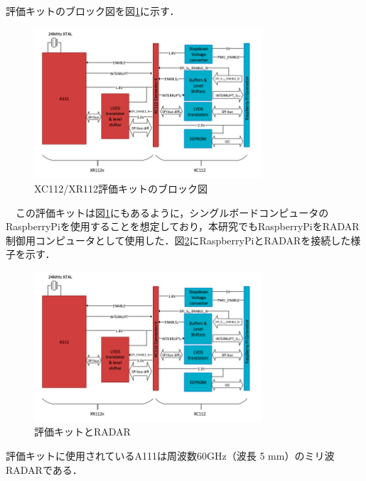 評価キットのブロック図を図\ref{fig:EVK_Block}に示す．
\begin{figure}[H]
    \centering
    \includegraphics[width=8.5cm]{./fig/EVK_Block.png}
    \caption{XC112/XR112評価キットのブロック図\cite{XC112_XR112UserGuide}}
    \label{fig:EVK_Block}
\end{figure}

　この評価キットは図\ref{fig:EVK_Block}にもあるように，シングルボードコンピュータのRaspberryPiを使用することを想定しており，本研究でもRaspberryPiをRADAR制御用コンピュータとして使用した．図\ref{fig:EVK_Connection}にRaspberryPiとRADARを接続した様子を示す．
\begin{figure}[H]
    \centering
    \includegraphics[width=8.5cm]{./fig/EVK_Block.png}
    \caption{評価キットとRADAR}
    \label{fig:EVK_Connection}
\end{figure}

評価キットに使用されているA111は周波数60GHz（波長 5 mm）のミリ波RADARである\cite{XC112_XR112UserGuide}．
